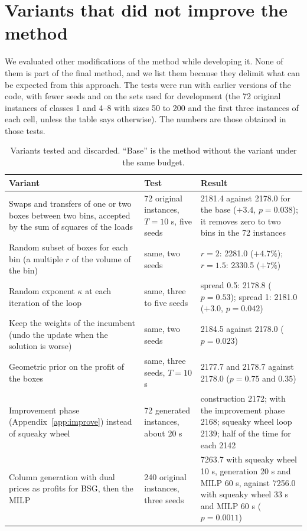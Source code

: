 \section{Variants that did not improve the method}
\label{app:negative}
\label{sec:e-negative}

We evaluated other modifications of the method while developing it. None of them is part of the final method, and we list them because they delimit what can be expected from this approach. The tests were run
with earlier versions of the code, with fewer seeds and on the sets used for development (the 72 original instances of classes 1 and 4--8 with sizes 50 to 200 and the first three instances of each cell,
unless the table says otherwise). The numbers are those obtained in those tests.

\begin{table}[t]
\centering
\small\setlength{\tabcolsep}{4pt}
\caption{Variants tested and discarded. ``Base'' is the method without the variant under the same budget.}
\label{tab:e-negative}
\begin{tabular}{@{}p{3.7cm}p{4.0cm}p{7.2cm}@{}}
\toprule
Variant & Test & Result\\
\midrule
Swaps and transfers of one or two boxes between two bins, accepted by the sum of squares of the loads & 72 original instances, $T=10$ s, five seeds & 2181.4 against 2178.0 for the base ($+3.4$, $p=0.038$); it removes zero to two bins in the 72 instances\\
Random subset of boxes for each bin (a multiple $r$ of the volume of the bin) & same, two seeds & $r=2$: 2281.0 ($+4.7\%$); $r=1.5$: 2330.5 ($+7\%$)\\
Random exponent $\kappa$ at each iteration of the loop & same, three to five seeds & spread 0.5: 2178.8 ($p=0.53$); spread 1: 2181.0 ($+3.0$, $p=0.042$)\\
Keep the weights of the incumbent (undo the update when the solution is worse) & same, two seeds & 2184.5 against 2178.0 ($p=0.023$)\\
Geometric prior on the profit of the boxes & same, three seeds, $T=10$ s & 2177.7 and 2178.7 against 2178.0 ($p=0.75$ and $0.35$)\\
Improvement phase (Appendix~\ref{app:improve}) instead of squeaky wheel & 72 generated instances, about 20 s & construction 2172; with the improvement phase 2168; squeaky wheel loop 2139; half of the time for each 2142\\
Column generation with dual prices as profits for BSG, then the MILP & 240 original instances, three seeds & 7263.7 with squeaky wheel 10 s, generation 20 s and MILP 60 s, against 7256.0 with squeaky wheel 33 s and MILP 60 s ($p=0.0011$)\\

\end{tabular}
\end{table}
